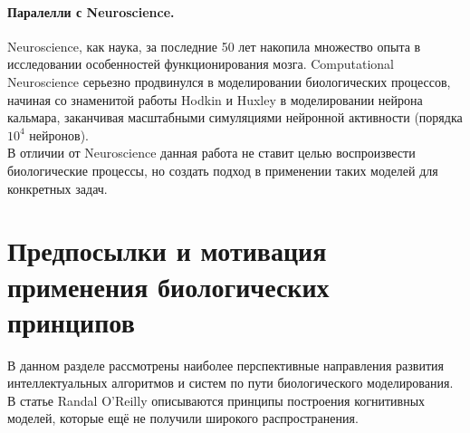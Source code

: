 \documentclass[a4paper,10pt]{article}
\begin{document}
\paragraph*{Паралелли с Neuroscience.} Neuroscience, как наука, за последние 50 лет накопила множество опыта в исследовании особенностей функционирования мозга. Computational Neuroscience серьезно продвинулся в моделировании биологических процессов, начиная со знаменитой работы Hodkin и Huxley\cite{hodhux} в моделировании нейрона кальмара, заканчивая масштабными симуляциями нейронной активности\cite{izh_large} (порядка $10^4$ нейронов).\\
\indent В отличии от Neuroscience данная работа не ставит целью воспроизвести биологические процессы, но создать подход в применении таких моделей для конкретных задач.
\section*{Предпосылки и мотивация применения биологических принципов}
В данном разделе рассмотрены наиболее перспективные направления развития интеллектуальных алгоритмов и систем по пути биологического моделирования. В статье Randal O'Reilly \cite{randall98} описываются принципы построения когнитивных моделей, которые ещё не получили широкого распространения.
\end{document}
